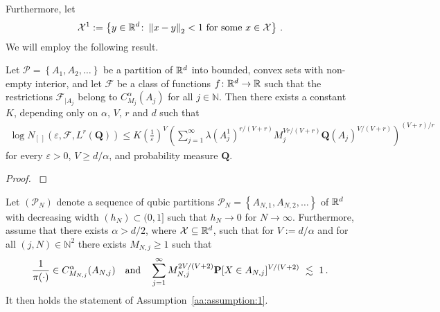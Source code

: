 Furthermore, let
\begin{gather*}
  \mathcal{X}^1
  :=
  \left\{ 
    y\in\R^d
    \colon
    \norm{x-y}_2 <1
    \ 
    \text{for some}\ x\in\mathcal{X}
  \right\}
  \,.
\end{gather*}
We will employ the following result.
\begin{lemma}
  \label{vdv_coro}
  Let $\mathcal{P}=\left\{ A_1,A_2,\ldots \right\}$ be a partition of $\mathbb{R}^d$ into bounded, convex sets with non-empty interior, and let $\mathcal{F}$ be a class of functions $f\colon\mathbb{R}^d\to\mathbb{R}$ such that the restrictions $\mathcal{F}_{|A_j}$ belong to $C^\alpha_{M_j}(A_j)$
  for all $j\in\mathbb{N}$.
  Then there exists a constant $K$, depending only on $\alpha$, $V$, $r$ and $d$
  such that
  \begin{gather}
    \label{667}
    \log
    N_{[\,]}
    (
    \varepsilon
    ,
    \mathcal{F}
    ,
    L^r(\mathbf{Q})
    )
    \le
    K
    \left( \frac{1}{\varepsilon} \right)^V
    \left( 
      \sum_{j=1}^{\infty}
      \lambda(A_j^1)^{r/(V+r)}
      M_j^{Vr/(V+r)}
      \mathbf{Q}(A_j)^{V/(V+r)}
    \right)
    ^{(V+r)/r}
  \end{gather}
  for every $\varepsilon>0$, $V\ge d/\alpha$, and probability measure $\mathbf{Q}$.
\end{lemma}
\begin{proof}
  \emph{\cite[Corollary~2.7.4]{vaart2013}}
\end{proof}
\pagebreak
\begin{lemma}
  Let $(\mathcal{P}_N)$ denote a sequence of qubic partitions
  $\mathcal{P}_N=\left\{ A_{N,1},A_{N,2},\ldots \right\}$ 
  of $\mathbb{R}^d$ 
  with decreasing width $(h_N)\subset(0,1]$ such that $h_N\to 0$ for $N\to\infty$.
  Furthermore, assume that there exists
  $\alpha>d/2$, where $\mathcal{X}\subseteq \mathbb{R}^d$, such
  that for 
  $V:=d/\alpha$
 and for all 
$
(j,N)\in\mathbb{N}^2
$
there exists 
$M_{N,j}\ge 1$ such that 
\begin{gather}
  \label{897}
  \frac{1}{\pi(\cdot)}
  \in C^\alpha_{M_{N,j}}(A_{N,j})
  \quad
  \text{and}
  \quad
  \sum_{j=1}^{\infty} 
  M_{N,j}^{2V/(V+2)}
  \P
  [
  X\in A_{N,j}
  ]^{V/(V+2)}
  \ 
  \lesssim
  \ 
  1
  \,.
\end{gather}
It then holds the statement of Assumption~\ref{aa:assumption:1}.
\end{lemma}
